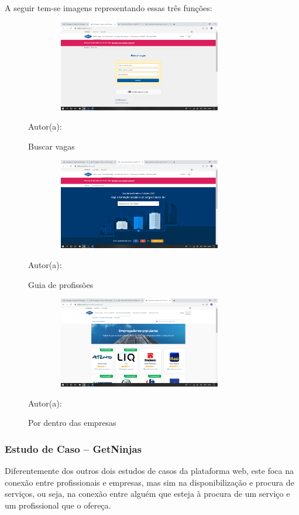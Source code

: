 A seguir tem-se imagens representando essas três funções:

\begin{figure}[!h]
	\centering
	\caption{Buscar vagas}
	\includegraphics[width=380px, height=150px]{./images/cattho1.png}
	\par {Autor(a): \cite{catho-1}}
\end{figure}

\begin{figure}[!h]
	\centering
	\caption{Guia de profissões}
	\includegraphics[width=380px, height=150px]{./images/cattho2.png}
	\par {Autor(a): \cite{catho-2}}
\end{figure}

\begin{figure}[!h]
	\centering
	\caption{Por dentro das empresas}
	\includegraphics[width=380px, height=150px]{./images/cattho3.png}
	\par {Autor(a): \cite{catho-3}}
\end{figure}
\newpage 
\subsubsection{Estudo de Caso – GetNinjas}

Diferentemente dos outros dois estudos de casos da plataforma web, este foca na conexão entre profissionais e empresas, mas sim na disponibilização e procura de serviços, ou seja, na conexão entre alguém que esteja à procura de um serviço e um profissional que o ofereça.

